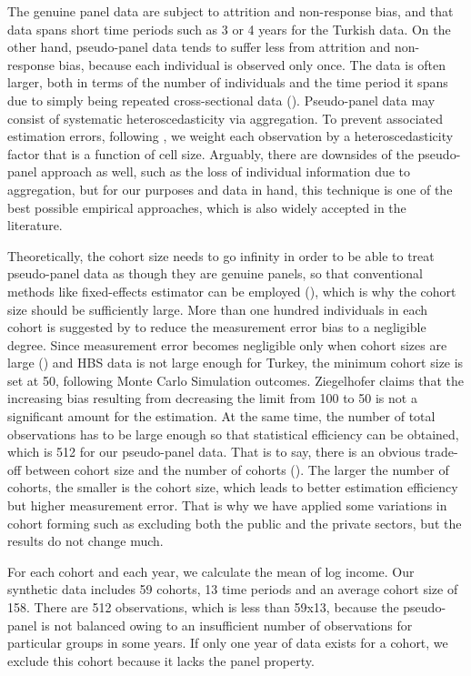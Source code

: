 \documentclass[12pt,author-year]{article}
\begin{document}
The genuine panel data are subject to attrition and non-response bias, and that data spans short time periods such as 3 or 4 years for the Turkish data. On the other hand, pseudo-panel data tends to suffer less from attrition and non-response bias, because each individual is observed only once. The data is often larger, both in terms of the number of individuals and the time period it spans due to simply being repeated cross-sectional data (\citealp{Verbeek2}). Pseudo-panel data may consist of systematic heteroscedasticity via aggregation. To prevent associated estimation errors, following \cite{Gardes}, we weight each observation by a heteroscedasticity factor that is a function of cell size. Arguably, there are downsides of the pseudo-panel approach as well, such as the loss of individual information due to aggregation, but for our purposes and data in hand, this technique is one of the best possible empirical approaches, which is also widely accepted in the literature.

Theoretically, the cohort size needs to go infinity in order to be able to treat pseudo-panel data as though they are genuine panels, so that conventional methods like fixed-effects estimator can be employed (\citealp{Inoue}), which is why the cohort size should be sufficiently large. More than one hundred individuals in each cohort is suggested by \cite{Verbeek} to reduce the measurement error bias to a negligible degree. Since measurement error becomes negligible only when cohort sizes are large (\citealp{Moffitt}) and HBS data is not large enough for Turkey, the minimum cohort size is set at 50, following \cite{Ziegelhofer} Monte Carlo Simulation outcomes. Ziegelhofer claims that the increasing bias resulting from decreasing the limit from 100 to 50 is not a significant amount for the estimation. At the same time, the number of total observations has to be large enough so that statistical efficiency can be obtained, which is 512 for our pseudo-panel data. That is to say, there is an obvious trade-off between cohort size and the number of cohorts (\citealp{Verbeek2}). The larger the number of cohorts, the smaller is the cohort size, which leads to better estimation efficiency but higher measurement error. That is why we have applied some variations in cohort forming such as excluding both the public and the private sectors, but the results do not change much.

For each cohort and each year, we calculate the mean of log income. Our synthetic data includes 59 cohorts, 13 time periods and an average cohort size of 158. There are 512 observations, which is less than 59x13, because the pseudo-panel is not balanced owing to an insufficient number of observations for particular groups in some years. If only one year of data exists for a cohort, we exclude this cohort because it lacks the panel property.
\end{document}
